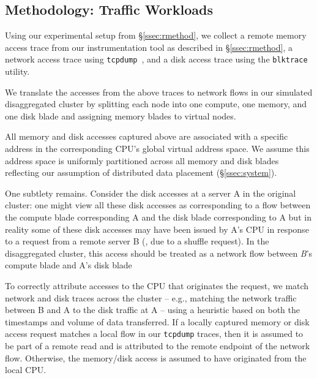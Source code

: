 \subsection{Methodology: \dis Traffic Workloads}
\label{ssec:ssmethod-traffic}
\vspace{-0.05in}
Using our experimental setup from \S\ref{ssec:rmethod}, we collect a remote memory access trace from our instrumentation tool as described in \S\ref{ssec:rmethod}, a network access trace using {\tt tcpdump}~\cite{tcpdump}, and a disk access trace using the {\tt blktrace} utility.

We translate the accesses from the above traces to network flows 
in our simulated disaggregated cluster by splitting each node into one compute, one memory, and one disk blade and assigning memory blades to virtual nodes.

All memory and disk accesses captured above are associated with a specific address in the corresponding CPU's global virtual address space. We assume this address space is uniformly partitioned across all memory and disk blades reflecting our assumption of distributed data placement (\S\ref{ssec:system}).  

One subtlety remains. Consider the disk accesses at a server A in the original cluster: one might view all these disk accesses as corresponding to a flow between the compute blade corresponding A and the disk blade corresponding to A but in reality some of these disk accesses may have been issued by A's CPU in response to a request from a remote server B (\eg, due to a shuffle request). 
In the disaggregated cluster, this access should be treated as a network flow between \emph{B}'s compute blade and A's disk blade %

To correctly attribute accesses to the CPU that originates the request, we match network and disk traces across the cluster -- e.g., matching the network traffic between B and A to the disk traffic at A -- using a heuristic based on both the timestamps and volume of data transferred. 
If a locally captured memory or disk access request matches a local flow in our {\tt tcpdump} traces, then it is assumed to be part of a remote read and is attributed to the remote endpoint of the network flow.
Otherwise, the memory/disk access is assumed to have originated from the local CPU. 
%

